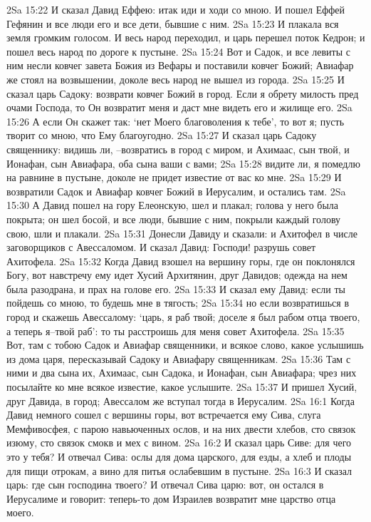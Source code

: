 2Sa 15:22  И сказал Давид Еффею: итак иди и ходи со мною. И пошел Еффей Гефянин и все люди его и все дети, бывшие с ним.
2Sa 15:23  И плакала вся земля громким голосом. И весь народ переходил, и царь перешел поток Кедрон; и пошел весь народ по дороге к пустыне.
2Sa 15:24  Вот и Садок, и все левиты с ним несли ковчег завета Божия из Вефары и поставили ковчег Божий; Авиафар же стоял на возвышении, доколе весь народ не вышел из города.
2Sa 15:25  И сказал царь Садоку: возврати ковчег Божий в город. Если я обрету милость пред очами Господа, то Он возвратит меня и даст мне видеть его и жилище его.
2Sa 15:26  А если Он скажет так: `нет Моего благоволения к тебе', то вот я; пусть творит со мною, что Ему благоугодно.
2Sa 15:27  И сказал царь Садоку священнику: видишь ли, --возвратись в город с миром, и Ахимаас, сын твой, и Ионафан, сын Авиафара, оба сына ваши с вами;
2Sa 15:28  видите ли, я помедлю на равнине в пустыне, доколе не придет известие от вас ко мне.
2Sa 15:29  И возвратили Садок и Авиафар ковчег Божий в Иерусалим, и остались там.
2Sa 15:30  А Давид пошел на гору Елеонскую, шел и плакал; голова у него была покрыта; он шел босой, и все люди, бывшие с ним, покрыли каждый голову свою, шли и плакали.
2Sa 15:31  Донесли Давиду и сказали: и Ахитофел в числе заговорщиков с Авессаломом. И сказал Давид: Господи! разрушь совет Ахитофела.
2Sa 15:32  Когда Давид взошел на вершину горы, где он поклонялся Богу, вот навстречу ему идет Хусий Архитянин, друг Давидов; одежда на нем была разодрана, и прах на голове его.
2Sa 15:33  И сказал ему Давид: если ты пойдешь со мною, то будешь мне в тягость;
2Sa 15:34  но если возвратишься в город и скажешь Авессалому: `царь, я раб твой; доселе я был рабом отца твоего, а теперь я--твой раб': то ты расстроишь для меня совет Ахитофела.
2Sa 15:35  Вот, там с тобою Садок и Авиафар священники, и всякое слово, какое услышишь из дома царя, пересказывай Садоку и Авиафару священникам.
2Sa 15:36  Там с ними и два сына их, Ахимаас, сын Садока, и Ионафан, сын Авиафара; чрез них посылайте ко мне всякое известие, какое услышите.
2Sa 15:37  И пришел Хусий, друг Давида, в город; Авессалом же вступал тогда в Иерусалим.
2Sa 16:1  Когда Давид немного сошел с вершины горы, вот встречается ему Сива, слуга Мемфивосфея, с парою навьюченных ослов, и на них двести хлебов, сто связок изюму, сто связок смокв и мех с вином.
2Sa 16:2  И сказал царь Сиве: для чего это у тебя? И отвечал Сива: ослы для дома царского, для езды, а хлеб и плоды для пищи отрокам, а вино для питья ослабевшим в пустыне.
2Sa 16:3  И сказал царь: где сын господина твоего? И отвечал Сива царю: вот, он остался в Иерусалиме и говорит: теперь-то дом Израилев возвратит мне царство отца моего.
